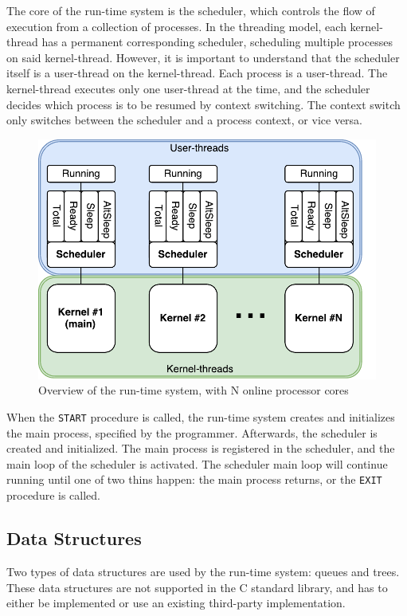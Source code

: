The core of the run\hyp{}time system is the scheduler, which controls the flow of execution from a collection of processes. In the threading model, each kernel\hyp{}thread has a permanent corresponding scheduler, scheduling multiple processes on said kernel\hyp{}thread. However, it is important to understand that the scheduler itself is a user\hyp{}thread on the kernel\hyp{}thread. Each process is a user\hyp{}thread. The kernel\hyp{}thread executes only one user\hyp{}thread at the time, and the scheduler decides which process is to be resumed by context switching. The context switch only switches between the scheduler and a process context, or vice versa. 

\begin{figure}[h!]
    \centering
    \includegraphics[width=0.6\linewidth]{fig/run-time_system}
    \caption{Overview of the run-time system, with N online processor cores}
    \label{fig:run-time_system}
\end{figure}

When the \texttt{START} procedure is called, the run\hyp{}time system creates and initializes the main process, specified by the programmer. Afterwards, the scheduler is created and initialized. The main process is registered in the scheduler, and the main loop of the scheduler is activated. The scheduler main loop will continue running until one of two thins happen: the main process returns, or the \texttt{EXIT} procedure is called. 


\subsection{Data Structures}
\label{subsec:data_structures}

Two types of data structures are used by the run\hyp{}time system: queues and trees. These data structures are not supported in the C standard library, and has to either be implemented or use an existing third\hyp{}party implementation.

